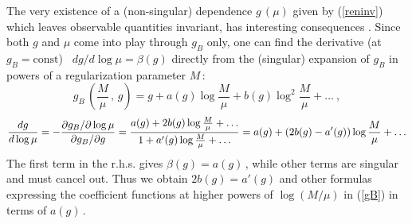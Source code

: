 \documentclass[a4paper,12pt]{article}
\begin{document}
The very existence of a (non-singular) dependence $g\,(\mu)$ given by
(\ref{reninv}) which leaves observable quantities invariant, has interesting
consequences \cite{tH}. Since both $g$ and $\mu$ come into play through
$g_B$ only, one can find the derivative (at $g_B=\text{const}$) \,
$dg/d\log\mu=\beta(g)$ directly from the (singular) expansion of $g_B$
in powers of a regularization parameter $M$\,:
\begin{equation}
\label{gB}
g_B\,(\frac{M}{\mu}\,,\,g) = g + a(g)\log\frac{M}{\mu}
 + b(g)\log^2\frac{M}{\mu} + \ldots\ ,
\end{equation}
\begin{equation}
\notag
\frac{dg}{d\log\mu}
 = -\frac{\partial g_B/\partial\log\mu}{\partial g_B/\partial g}
 = \frac{a(g) + 2b(g)\log\frac{M}{\mu} + \ldots}
  {1 + a'(g)\log\frac{M}{\mu} + \ldots}
 = a(g) + (2b(g) - a'(g))\log\frac{M}{\mu} + \ldots
\end{equation}
The first term in the r.h.s. gives $\beta(g)=a(g)$\,, while other terms are
singular and must cancel out. Thus we obtain $2b(g)=a'(g)$ and other
formulas expressing the coefficient functions at higher powers of
$\log(M/\mu)$ in (\ref{gB}) in terms of $a(g)$\,.
\end{document}
